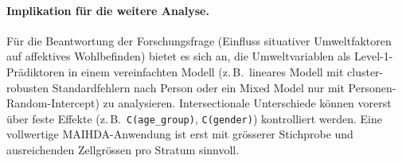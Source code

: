 \paragraph{Implikation für die weitere Analyse.}
Für die Beantwortung der Forschungsfrage (Einfluss situativer Umweltfaktoren auf affektives Wohlbefinden) bietet es sich an, die Umweltvariablen als Level-1-Prädiktoren in einem vereinfachten Modell (z.\,B.\ lineares Modell mit cluster-robusten Standardfehlern nach Person oder ein Mixed Model nur mit Personen-Random-Intercept) zu analysieren. Intersectionale Unterschiede können vorerst über feste Effekte (z.\,B.\ \texttt{C(age\_group)}, \texttt{C(gender)}) kontrolliert werden. Eine vollwertige MAIHDA-Anwendung ist erst mit grösserer Stichprobe und ausreichenden Zellgrössen pro Stratum sinnvoll.



